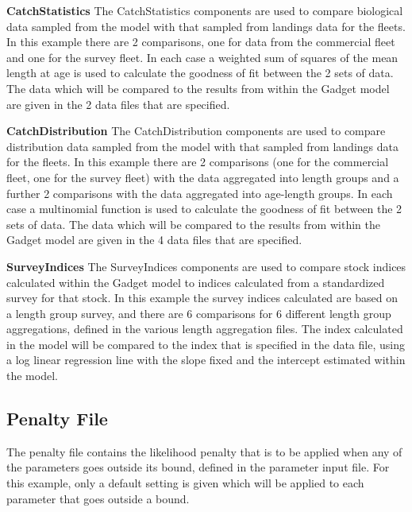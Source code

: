 \documentclass[10pt,twoside]{article}
\begin{document}
\bigskip
{\bf CatchStatistics}\newline
The CatchStatistics components are used to compare biological data sampled from the model with that sampled from landings data for the fleets.  In this example there are 2 comparisons, one for data from the commercial fleet and one for the survey fleet.  In each case a weighted sum of squares of the mean length at age is used to calculate the goodness of fit between the 2 sets of data.  The data which will be compared to the results from within the Gadget model are given in the 2 data files that are specified.

\bigskip
{\bf CatchDistribution}\newline
The CatchDistribution components are used to compare distribution data sampled from the model with that sampled from landings data for the fleets.  In this example there are 2 comparisons (one for the commercial fleet, one for the survey fleet) with the data aggregated into length groups and a further 2 comparisons with the data aggregated into age-length groups.  In each case a multinomial function is used to calculate the goodness of fit between the 2 sets of data.  The data which will be compared to the results from within the Gadget model are given in the 4 data files that are specified.

\bigskip
{\bf SurveyIndices}\newline
The SurveyIndices components are used to compare stock indices calculated within the Gadget model to indices calculated from a standardized survey for that stock.  In this example the survey indices calculated are based on a length group survey, and there are 6 comparisons for 6 different length group aggregations, defined in the various length aggregation files.  The index calculated in the model will be compared to the index that is specified in the data file, using a log linear regression line with the slope fixed and the intercept estimated within the model.

{\small }

\subsection{Penalty File}
The penalty file contains the likelihood penalty that is to be applied when any of the parameters goes outside its bound, defined in the parameter input file.  For this example, only a default setting is given which will be applied to each parameter that goes outside a bound.
\end{document}
